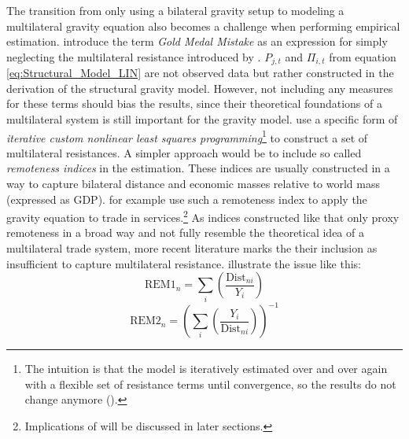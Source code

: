 The transition from only using a bilateral gravity setup to modeling a multilateral gravity equation also becomes a challenge when performing empirical estimation. \textcite{NBERw12516} introduce the term \textit{Gold Medal Mistake} as an expression for simply neglecting the multilateral resistance introduced by \textcite{Anderson2003}. $P_{j,t}$ and $\Pi_{i,t}$ from equation \ref{eq:Structural_Model_LIN} are not observed data but rather constructed in the derivation of the structural gravity model. However, not including any measures for these terms should bias the results, since their theoretical foundations of a multilateral system is still important for the gravity model. \textcite{Anderson2003} use a specific form of \textit{iterative custom nonlinear least squares programming}\footnote{The intuition is that the model is iteratively estimated over and over again with a flexible set of resistance terms until convergence, so the results do not change anymore (\cite[p. 18]{yotov2016advanced}).} to construct a set of multilateral resistances. A simpler approach would be to include so called \textit{remoteness indices} in the estimation. These indices are usually constructed in a way to capture bilateral distance and economic masses relative to world mass (expressed as GDP). \textcite{Kimura2006} for example use such a remoteness index to apply the gravity equation to trade in services.\footnote{Implications of \textcite{Kimura2006} will be discussed in later sections.} As indices constructed like that only proxy remoteness in a broad way and not fully resemble the theoretical idea of a multilateral trade system, more recent literature marks the their inclusion as insufficient to capture multilateral resistance. \textcite[p. 150]{cookbook} illustrate the issue like this: \begin{equation}
    \label{eq:REM1}
    \text{REM1}_n = \sum_i \left(\frac{\text{Dist}_{ni}}{Y_i}\right)
\end{equation} \begin{equation}
    \label{eq:REM2}
    \text{REM2}_n = \left(\sum_i \left(\frac{Y_i}{\text{Dist}_{ni}}\right)\right)^{-1}

\end{equation}
